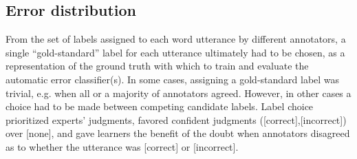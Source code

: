 \documentclass[a4paper]{article}
\newcommand{\TODO}[1]{{\color{red}\textbf{[TODO #1]}}}
\begin{document}
	

		
		
		
		
			
		
		
		\subsection{Error distribution}
		\label{sec:data:errors}
		
		From the set of labels assigned to each word utterance by different annotators, a single ``gold-standard'' label for each utterance ultimately had to be chosen, as a representation of the ground truth with which to train and evaluate the automatic error classifier(s).
		In some cases, assigning a gold-standard label was trivial, e.g. when all or a majority of annotators agreed. However, in other cases a choice had to be made between competing candidate labels. 
		Label choice prioritized experts' judgments, favored confident judgments ([correct],[incorrect]) over [none], and gave learners the benefit of the doubt when annotators disagreed as to whether the utterance was [correct] or [incorrect].
	
\end{document}
